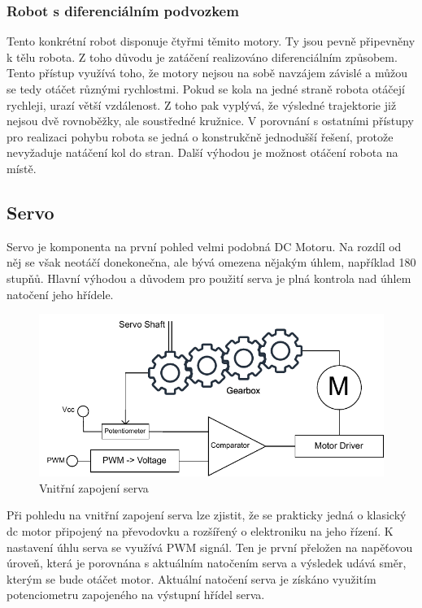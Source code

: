 \subsubsection{Robot s diferenciálním podvozkem}
Tento konkrétní robot disponuje čtyřmi těmito motory. Ty jsou pevně připevněny k tělu robota. Z toho důvodu je zatáčení realizováno diferenciálním způsobem. Tento přístup využívá toho, že motory nejsou na sobě navzájem závislé a můžou se tedy otáčet různými rychlostmi. Pokud se kola na jedné straně robota otáčejí rychleji, urazí větší vzdálenost. Z toho pak vyplývá, že výsledné trajektorie již nejsou dvě rovnoběžky, ale soustředné kružnice. V porovnání s ostatními přístupy pro realizaci pohybu robota se jedná o konstrukčně jednodušší řešení, protože nevyžaduje natáčení kol do stran. Další výhodou je možnost otáčení robota na místě.

\subsection*{Servo}
Servo je komponenta na první pohled velmi podobná DC Motoru. Na rozdíl od něj se však neotáčí donekonečna, ale bývá omezena nějakým úhlem, například 180 stupňů. Hlavní výhodou a důvodem pro použití serva je plná kontrola nad úhlem natočení jeho hřídele.\cite[str:~119-121]{embeded_robotics}

\begin{figure}[h!]
	\centering
	\includegraphics[scale=0.9]{obrazky-figures/servo.pdf}
	\caption{Vnitřní zapojení serva}
	\label{}
\end{figure}

Při pohledu na vnitřní zapojení serva lze zjistit, že se prakticky jedná o klasický dc motor připojený na převodovku a rozšířený o elektroniku na jeho řízení. K nastavení úhlu serva se využívá PWM signál. Ten je první přeložen na napěťovou úroveň, která je porovnána s aktuálním natočením serva a výsledek udává směr, kterým se bude otáčet motor. Aktuální natočení serva je získáno využitím potenciometru zapojeného na výstupní hřídel serva.%

